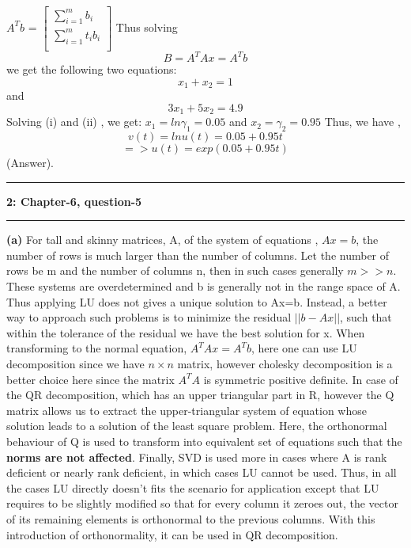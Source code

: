\documentclass{article}
\newcommand\question[2]{\vspace{.25in}\hrule\textbf{#1: #2}\hrule\vspace{.10in}}
\renewcommand\part[1]{\vspace{.10in}\textbf{(#1)}}
\begin{document}
$A^Tb$ = $\begin{bmatrix}
	\sum_{i=1}^m b_i \\
	\sum_{i=1}^m t_ib_i \\
\end{bmatrix}$
Thus solving
\[ B = A^TAx = A^Tb\]
we get the following two equations: \newline
\begin{equation}
	x_1 + x_2 = 1
\end{equation}
and 
\begin{equation}
	3x_1 + 5x_2 = 4.9
\end{equation}
Solving (i) and (ii) , we get: $x_1 = ln\gamma_1 = 0.05$ and $x_2 = \gamma_2 = 0.95$ \newline
Thus, we have , 
\[v(t) = lnu(t) = 0.05 + 0.95t\]
\[=> u(t) = exp(0.05 + 0.95t)\]
(Answer). \newline

\question{2}{Chapter-6, question-5}
\part{a} For tall and skinny matrices, A, of the system of equations , $Ax=b$, the number of rows is much larger than  the number of columns. Let the number of rows be m and the number of columns n, then in such cases generally $m >> n$. These systems are overdetermined and b is generally not in the range space of A. Thus applying LU does not gives a unique solution to Ax=b. Instead, a better way to approach such problems is to minimize the residual $||b-Ax||$, such that within the tolerance of the residual we have the best solution for x. When transforming to the normal equation, $A^TAx = A^Tb$, here one can use LU decomposition since we have $n\times n$ matrix, however cholesky decomposition is a better choice here since the matrix $A^TA$ is symmetric positive definite. In case of the QR decomposition, which has an upper triangular part in R, however the Q matrix allows us to extract the upper-triangular system of equation whose solution leads to a solution of the least square problem. Here, the orthonormal behaviour of Q is used to transform into equivalent set of equations such that the \textbf {norms are not affected}. Finally, SVD is used more in cases where A is rank deficient or nearly rank deficient, in which cases LU cannot be used. Thus, in all the cases LU directly doesn't fits the scenario for application except that LU requires to be slightly modified so that for every column it zeroes out, the vector of its remaining elements is orthonormal to the previous columns. With this introduction of orthonormality, it can be used in QR decomposition. \newline
\end{document}
